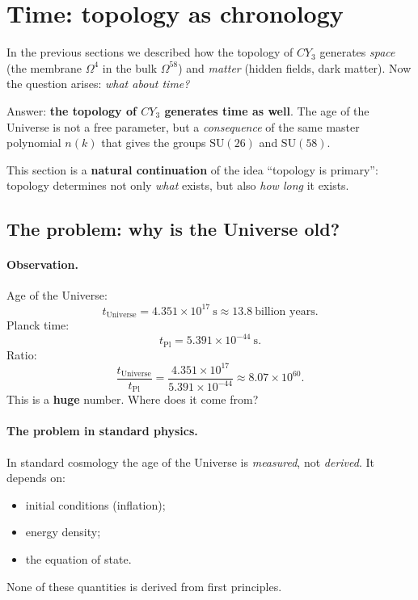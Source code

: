 \documentclass[11pt,a4paper]{article}
\newcommand{\SU}{\mathrm{SU}}
\newcommand{\CY}{CY_3}
\newcommand{\Om}{\Omega^4}
\newcommand{\Omfi}{\Omega^{58}}
\theoremstyle{definition}
\begin{document}
\section{Time: topology as chronology}
\label{sec:time}

In the previous sections we described how the topology of $\CY$ generates 
\emph{space} (the membrane $\Om$ in the bulk $\Omfi$) and 
\emph{matter} (hidden fields, dark matter). Now the question arises: 
\emph{what about time?}

Answer: \textbf{the topology of $\CY$ generates time as well}. The age 
of the Universe is not a free parameter, but a \emph{consequence} of the same 
master polynomial $n(k)$ that gives the groups $\SU(26)$ and $\SU(58)$.

This section is a \textbf{natural continuation} of the idea ``topology 
is primary'': topology determines not only \emph{what} exists, 
but also \emph{how long} it exists.

\subsection{The problem: why is the Universe old?}
\label{subsec:time-problem}

\paragraph{Observation.}
Age of the Universe:
\begin{equation}
    t_{\text{Universe}} = 4.351 \times 10^{17}~\text{s}
    \approx 13.8~\text{billion years}.
\end{equation}
Planck time:
\begin{equation}
    t_{\text{Pl}} = 5.391 \times 10^{-44}~\text{s}.
\end{equation}
Ratio:
\begin{equation}
    \frac{t_{\text{Universe}}}{t_{\text{Pl}}} 
    = \frac{4.351 \times 10^{17}}{5.391 \times 10^{-44}}
    \approx 8.07 \times 10^{60}.
\end{equation}
This is a \textbf{huge} number. Where does it come from?

\paragraph{The problem in standard physics.}
In standard cosmology the age of the Universe is \emph{measured}, not 
\emph{derived}. It depends on:
\begin{itemize}
    \item initial conditions (inflation);
    \item energy density;
    \item the equation of state.
\end{itemize}
None of these quantities is derived from first principles.
\end{document}
